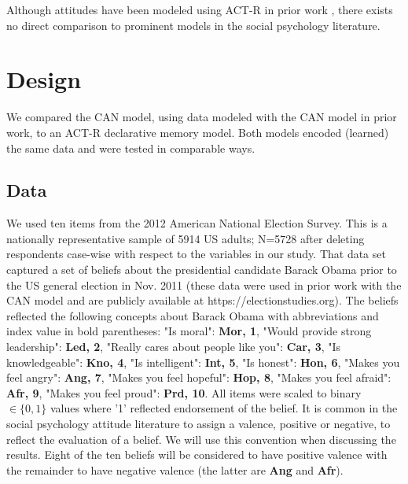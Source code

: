 \documentclass[10pt,letterpaper]{article}
\begin{document}
Although attitudes have been modeled using ACT-R in prior work \citep{orrICCM2021, pirolli2016computational, pirolli2016good, pirolli2020cognitive}, there exists no direct comparison to prominent models in the social psychology literature.
 
\section{Design}
We compared the CAN model, using data modeled with the CAN model in prior work, to an ACT-R declarative memory model.  Both models encoded (learned) the same data and were tested in comparable ways.    

\subsection{Data}
We used ten items from the 2012 American National Election Survey. This is a nationally representative sample of 5914 US adults; N=5728 after deleting respondents case-wise with respect to the variables in our study. That data set captured a set of beliefs about the presidential candidate Barack Obama prior to the US general election in Nov. 2011 (these data were used in prior work with the CAN model and are publicly available at https://electionstudies.org).  The beliefs reflected the following concepts about Barack Obama with abbreviations and index value in bold parentheses: "Is moral": \textbf{Mor, 1}, "Would provide strong leadership": \textbf{Led, 2}, "Really cares about people like you": \textbf{Car, 3}, "Is knowledgeable": \textbf{Kno, 4}, "Is intelligent": \textbf{Int, 5}, "Is honest": \textbf{Hon, 6}, "Makes you feel angry": \textbf{Ang, 7}, "Makes you feel hopeful": \textbf{Hop, 8}, "Makes you feel afraid": \textbf{Afr, 9}, "Makes you feel proud": \textbf{Prd, 10}. All items were scaled to binary $\in\{0,1\}$ values where '1' reflected endorsement of the belief.  It is common in the social psychology attitude literature to assign a valence, positive or negative, to reflect the evaluation of a belief.  We will use this convention when discussing the results.  Eight of the ten beliefs will be considered to have positive valence with the remainder to have negative valence (the latter are \textbf{Ang} and  \textbf{Afr}).
\end{document}
